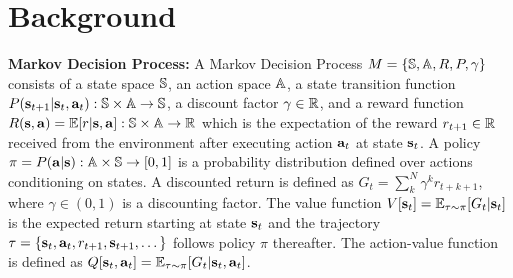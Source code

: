 \documentclass{article}
\begin{document}





\section{Background}
\label{sec:smdp_option}

\textbf{Markov Decision Process:} A Markov Decision Process
\cite{puterman2014markov} $M=\{{\mathbb{S}},{\mathbb{A}},R,P,\gamma\}$ consists of
a state space ${\mathbb{S}}$, an action space ${\mathbb{A}}$, a state transition
function $P({\mathbf{s}}_{t+1}|{\mathbf{s}}_t,{\mathbf{a}}_t):
{\mathbb{S}}\times{\mathbb{A}}\rightarrow{\mathbb{S}}$, a discount factor $\gamma\in{\mathbb{R}}$,
and a reward function
$R({\mathbf{s}},{\mathbf{a}})=\mathbb{E}[r|{\mathbf{s}},{\mathbf{a}}]:{\mathbb{S}}\times{\mathbb{A}}\rightarrow{\mathbb{R}}$ which
is the expectation of the reward $r_{t+1}\in{\mathbb{R}}$ received from
the environment after executing action ${\mathbf{a}}_t$ at state
${\mathbf{s}}_t$. A policy
$\pi=P({\mathbf{a}}|{\mathbf{s}}):{\mathbb{A}}\times{\mathbb{S}}\rightarrow[0,1]$ is a probability
distribution defined over actions conditioning on states. A
discounted return is defined as $G_t =
\sum_k^N\gamma^kr_{t+k+1}$, where $\gamma\in (0,1)$ is a
discounting factor. The value function
$V[{\mathbf{s}}_t]=\mathbb{E}_{\tau\sim\pi}[G_t|{\mathbf{s}}_t]$ is the expected return
starting at state ${\mathbf{s}}_t$ and the trajectory
$\tau=\{{\mathbf{s}}_t,{\mathbf{a}}_t,r_{t+1},{\mathbf{s}}_{t+1},\dots\}$ follows policy
$\pi$ thereafter. The action-value function is defined as
$Q[{\mathbf{s}}_t,{\mathbf{a}}_t]= \mathbb{E}_{\tau\sim\pi}[G_t|{\mathbf{s}}_t,{\mathbf{a}}_t]$.
\end{document}
